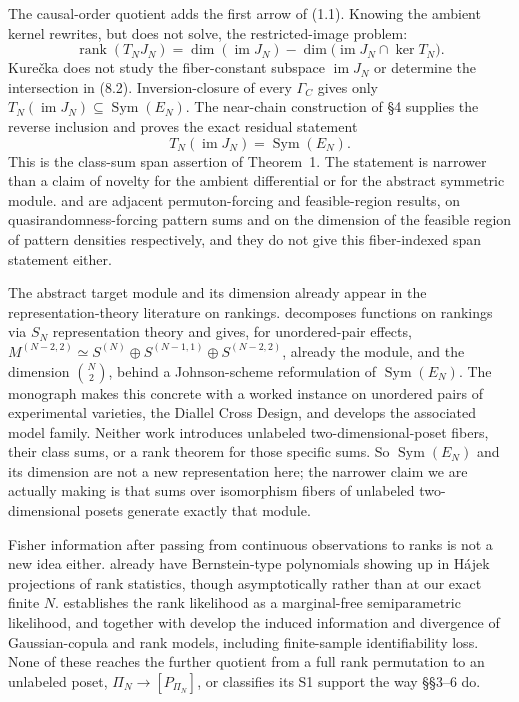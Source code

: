 \documentclass[11pt]{article}
\begin{document}
The causal-order quotient adds the first arrow of (1.1). Knowing the ambient kernel rewrites, but does not solve, the restricted-image problem:
\[
\operatorname{rank}(T_NJ_N)
=\dim(\operatorname{im}J_N)
-\dim\bigl(\operatorname{im}J_N\cap\ker T_N\bigr).
\tag{8.2}
\]
Kure\v{c}ka does not study the fiber-constant subspace $\operatorname{im}J_N$ or determine the intersection in (8.2). Inversion-closure of every $\Gamma_C$ gives only $T_N(\operatorname{im}J_N)\subseteq\operatorname{Sym}(E_N)$. The near-chain construction of \S4 supplies the reverse inclusion and proves the exact residual statement
\[
\boxed{T_N(\operatorname{im}J_N)=\operatorname{Sym}(E_N).}
\tag{8.3}
\]
This is the class-sum span assertion of Theorem~1. The statement is narrower than a claim of novelty for the ambient differential or for the abstract symmetric module. \citet{ChanKralNoelPehovaSharifzadehVolec2020} and \citet{GarbeKralMalekshahianPenaguiao2025} are adjacent permuton-forcing and feasible-region results, on quasirandomness-forcing pattern sums and on the dimension of the feasible region of pattern densities respectively, and they do not give this fiber-indexed span statement either.

The abstract target module and its dimension already appear in the representation-theory literature on rankings. \citet{Diaconis1989} decomposes functions on rankings via $S_N$ representation theory and gives, for unordered-pair effects, $M^{(N-2,2)}\simeq S^{(N)}\oplus S^{(N-1,1)}\oplus S^{(N-2,2)}$, already the module, and the dimension $\binom N2$, behind a Johnson-scheme reformulation of $\operatorname{Sym}(E_N)$. The monograph \citep{Diaconis1988} makes this concrete with a worked instance on unordered pairs of experimental varieties, the Diallel Cross Design, and develops the associated model family. Neither work introduces unlabeled two-dimensional-poset fibers, their class sums, or a rank theorem for those specific sums. So $\operatorname{Sym}(E_N)$ and its dimension are not a new representation here; the narrower claim we are actually making is that sums over isomorphism fibers of unlabeled two-dimensional posets generate exactly that module.

Fisher information after passing from continuous observations to ranks is not a new idea either. \citet{HallinMelloukRifi2001} already have Bernstein-type polynomials showing up in Hájek projections of rank statistics, though asymptotically rather than at our exact finite $N$. \citet{Hoff2007} establishes the rank likelihood as a marginal-free semiparametric likelihood, and \citet{HoffNiuWellner2014} together with \citet{SeiMatsumoto2020} develop the induced information and divergence of Gaussian-copula and rank models, including finite-sample identifiability loss. None of these reaches the further quotient from a full rank permutation to an unlabeled poset, $\Pi_N\to[P_{\Pi_N}]$, or classifies its S1 support the way \S\S3--6 do.
\end{document}
